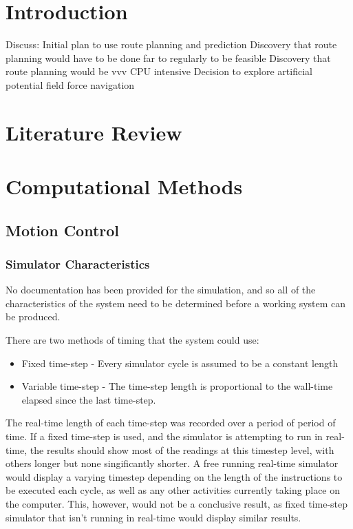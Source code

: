 \documentclass[10pt]{article} \usepackage[a4paper]{geometry}
\begin{document}


\section{Introduction}

Discuss: 
Initial plan to use route planning and prediction
Discovery that route planning would have to be done far to regularly to be
feasible
Discovery that route planning would be vvv CPU intensive
Decision to explore artificial potential field force navigation

\section{Literature Review}

\section{Computational Methods}

\subsection{Motion Control}

\subsubsection{Simulator Characteristics}

No documentation has been provided for the simulation, and so all of the
characteristics of the system need to be determined before a working system can
be produced.

There are two methods of timing that the system could use:
\begin{itemize}
 \item Fixed time-step - Every simulator cycle is assumed to be a constant
 length
 \item Variable time-step - The time-step length is proportional to the
 wall-time elapsed since the last time-step.
\end{itemize}

The real-time length of each time-step was recorded over a period of period of
time.  If a fixed time-step is used, and the simulator is attempting to run in
real-time, the results should show most of the readings at this timestep level,
 with others longer but none singificantly shorter.  A free running real-time
 simulator would display a varying timestep depending on the length of the
 instructions to be executed each cycle, as well as any other activities
 currently taking place on the computer.  This, however, would not be a
 conclusive result, as fixed time-step simulator that isn't running in real-time
 would display similar results.
\end{document}
